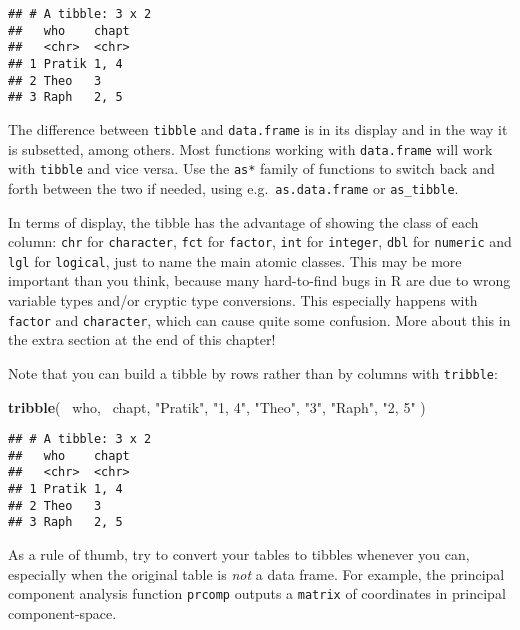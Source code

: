 \documentclass[
]{book}
\newenvironment{Shaded}{}{}
\newcommand{\KeywordTok}[1]{\textcolor[rgb]{0.00,0.44,0.13}{\textbf{#1}}}
\newcommand{\NormalTok}[1]{#1}
\newcommand{\OperatorTok}[1]{\textcolor[rgb]{0.40,0.40,0.40}{#1}}
\newcommand{\StringTok}[1]{\textcolor[rgb]{0.25,0.44,0.63}{#1}}
\begin{document}
\begin{verbatim}
## # A tibble: 3 x 2
##   who    chapt
##   <chr>  <chr>
## 1 Pratik 1, 4 
## 2 Theo   3    
## 3 Raph   2, 5
\end{verbatim}

The difference between \texttt{tibble} and \texttt{data.frame} is in its display and in the way it is subsetted, among others. Most functions working with \texttt{data.frame} will work with \texttt{tibble} and vice versa. Use the \texttt{as*} family of functions to switch back and forth between the two if needed, using e.g.~\texttt{as.data.frame} or \texttt{as\_tibble}.

In terms of display, the tibble has the advantage of showing the class of each column: \texttt{chr} for \texttt{character}, \texttt{fct} for \texttt{factor}, \texttt{int} for \texttt{integer}, \texttt{dbl} for \texttt{numeric} and \texttt{lgl} for \texttt{logical}, just to name the main atomic classes. This may be more important than you think, because many hard-to-find bugs in R are due to wrong variable types and/or cryptic type conversions. This especially happens with \texttt{factor} and \texttt{character}, which can cause quite some confusion. More about this in the extra section at the end of this chapter!

Note that you can build a tibble by rows rather than by columns with \texttt{tribble}:

\begin{Shaded}
\begin{Highlighting}[]
\KeywordTok{tribble}\NormalTok{(}
  \OperatorTok{~}\NormalTok{who, }\OperatorTok{~}\NormalTok{chapt,}
  \StringTok{"Pratik"}\NormalTok{, }\StringTok{"1, 4"}\NormalTok{,}
  \StringTok{"Theo"}\NormalTok{, }\StringTok{"3"}\NormalTok{,}
  \StringTok{"Raph"}\NormalTok{, }\StringTok{"2, 5"}
\NormalTok{)}
\end{Highlighting}
\end{Shaded}

\begin{verbatim}
## # A tibble: 3 x 2
##   who    chapt
##   <chr>  <chr>
## 1 Pratik 1, 4 
## 2 Theo   3    
## 3 Raph   2, 5
\end{verbatim}

As a rule of thumb, try to convert your tables to tibbles whenever you can, especially when the original table is \emph{not} a data frame. For example, the principal component analysis function \texttt{prcomp} outputs a \texttt{matrix} of coordinates in principal component-space.
\end{document}
